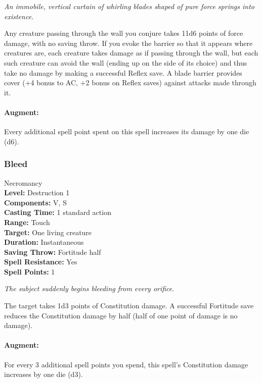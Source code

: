 \emph{An immobile, vertical curtain of whirling blades shaped of pure force springs into existence.}

Any creature passing through the wall you conjure takes 11d6 points of force damage, with no saving throw.
If you evoke the barrier so that it appears where creatures are, 
each creature takes damage as if passing through the wall, but each such creature can avoid the wall
(ending up on the side of its choice) and thus take no damage by making a successful Reflex save.
A blade barrier provides cover (+4 bonus to AC, +2 bonus on Reflex saves) against attacks made through it.

\paragraph{Augment:} Every additional spell point spent on this spell increases its damage by one die (d6).

\subsubsection{Bleed}
\label{Spell:Bleed}
Necromancy
\\ \textbf{Level:} Destruction 1
\\ \textbf{Components:} V, S
\\ \textbf{Casting Time:} 1 standard action
\\ \textbf{Range:} Touch
\\ \textbf{Target:} One living creature
\\ \textbf{Duration:} Instantaneous
\\ \textbf{Saving Throw:} Fortitude half
\\ \textbf{Spell Resistance:} Yes
\\ \textbf{Spell Points:} 1

\emph{The subject suddenly begins bleeding from every orifice.}

The target takes 1d3 points of Constitution damage. A successful Fortitude save reduces the Constitution damage by half (half of one point of damage is no damage).

\paragraph{Augment:} For every 3 additional spell points you spend, this spell's Constitution damage increases by one die (d3).
